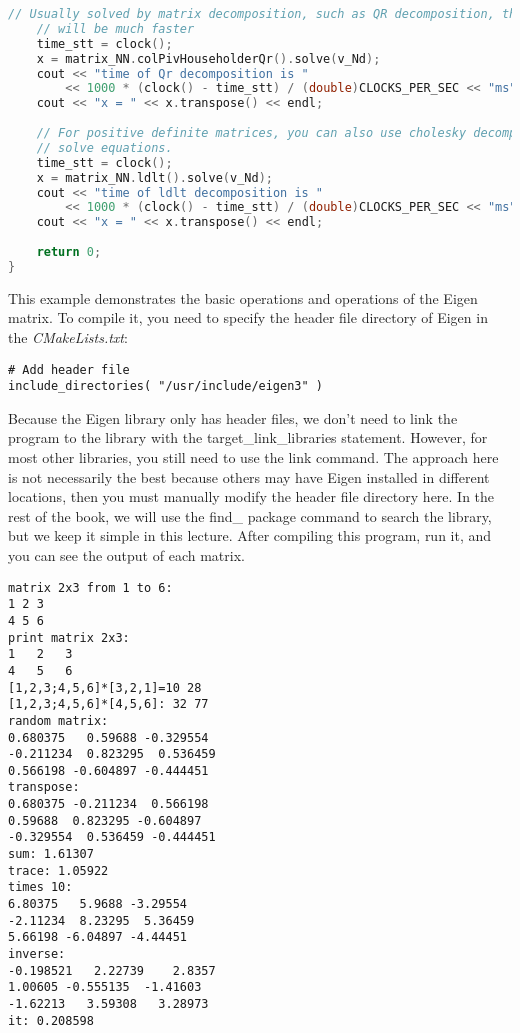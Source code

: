 \begin{lstlisting}[language=c++,caption=slambook2/ch3/useEigen/eigenMatrix.cpp]
    // Usually solved by matrix decomposition, such as QR decomposition, the speed
    // will be much faster
    time_stt = clock();
    x = matrix_NN.colPivHouseholderQr().solve(v_Nd);
    cout << "time of Qr decomposition is "
	    << 1000 * (clock() - time_stt) / (double)CLOCKS_PER_SEC << "ms" << endl;
    cout << "x = " << x.transpose() << endl;
    
    // For positive definite matrices, you can also use cholesky decomposition to
    // solve equations.
    time_stt = clock();
    x = matrix_NN.ldlt().solve(v_Nd);
    cout << "time of ldlt decomposition is "
	    << 1000 * (clock() - time_stt) / (double)CLOCKS_PER_SEC << "ms" << endl;
    cout << "x = " << x.transpose() << endl;
    
    return 0;
}
\end{lstlisting}

This example demonstrates the basic operations and operations of the Eigen matrix. To compile it, you need to specify the header file directory of Eigen in the \textit{CMakeLists.txt}:
\begin{lstlisting}[caption=slambook2/ch3/useEigen/CMakeLists.txt]
# Add header file
include_directories( "/usr/include/eigen3" )
\end{lstlisting}

Because the Eigen library only has header files, we don't need to link the program to the library with the target\_link\_libraries statement. However, for most other libraries, you still need to use the link command. The approach here is not necessarily the best because others may have Eigen installed in different locations, then you must manually modify the header file directory here. In the rest of the book, we will use the find\_ package command to search the library, but we keep it simple in this lecture. After compiling this program, run it, and you can see the output of each matrix.

\begin{lstlisting}[caption=Terminal output:]
% build/eigenMatrix
matrix 2x3 from 1 to 6: 
1 2 3
4 5 6
print matrix 2x3: 
1	2	3	
4	5	6	
[1,2,3;4,5,6]*[3,2,1]=10 28
[1,2,3;4,5,6]*[4,5,6]: 32 77
random matrix: 
0.680375   0.59688 -0.329554
-0.211234  0.823295  0.536459
0.566198 -0.604897 -0.444451
transpose: 
0.680375 -0.211234  0.566198
0.59688  0.823295 -0.604897
-0.329554  0.536459 -0.444451
sum: 1.61307
trace: 1.05922
times 10: 
6.80375   5.9688 -3.29554
-2.11234  8.23295  5.36459
5.66198 -6.04897 -4.44451
inverse: 
-0.198521   2.22739    2.8357
1.00605 -0.555135  -1.41603
-1.62213   3.59308   3.28973
it: 0.208598
\end{lstlisting}

